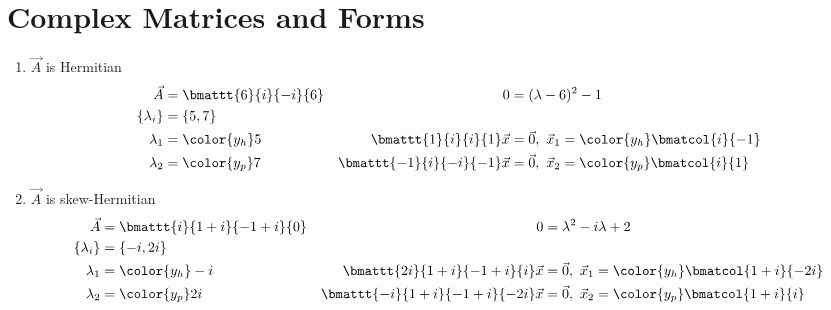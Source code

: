 \section{Complex Matrices and Forms}

\begin{enumerate}
    \item $\vec{A}$ is Hermitian
          \begin{align}
              \vec{A}                        & = \bmattt{6}{i}{-i}{6} &
              0                              & = (\lambda - 6)^2 - 1    \\
              \{\lambda_i\}                  & = \{5, 7\}               \\
              \lambda_1                      & = \color{y_h} 5        &
              \bmattt{1}{i}{i}{1} \vec{x}    & = \vec{0},\
              \vec{x}_1 = \color{y_h} \bmatcol{i}{-1}                   \\
              \lambda_2                      & = \color{y_p} 7        &
              \bmattt{-1}{i}{-i}{-1} \vec{x} & = \vec{0},\
              \vec{x}_2 = \color{y_p} \bmatcol{i}{1}
          \end{align}

    \item $\vec{A}$ is skew-Hermitian
          \begin{align}
              \vec{A}                             & = \bmattt{i}{1+i}{-1+i}{0}  &
              0                                   & = \lambda^2 - i\lambda  + 2   \\
              \{\lambda_i\}                       & = \{-i, 2i\}                  \\
              \lambda_1                           & = \color{y_h} -i            &
              \bmattt{2i}{1+i}{-1+i}{i} \vec{x}   & = \vec{0},\
              \vec{x}_1 = \color{y_h} \bmatcol{1+i}{-2i}                          \\
              \lambda_2                           & = \color{y_p} 2i            &
              \bmattt{-i}{1+i}{-1+i}{-2i} \vec{x} & = \vec{0},\
              \vec{x}_2 = \color{y_p} \bmatcol{1+i}{i}
          \end{align}


\end{enumerate}
